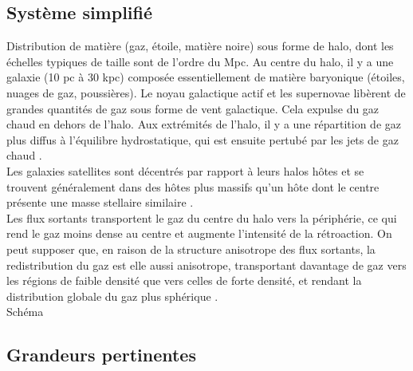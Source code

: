 \documentclass[a4paper, french, 11 pt]{article}
\begin{document}
\subsection{Système simplifié}
Distribution de matière (gaz, étoile, matière noire) sous forme de halo, dont les échelles typiques de taille sont de l'ordre du Mpc. Au centre du halo, il y a une galaxie (10 pc à 30 kpc) composée essentiellement de matière baryonique (étoiles, nuages de gaz, poussières). Le noyau galactique actif et les supernovae libèrent de grandes quantités de gaz sous forme de vent galactique. Cela expulse du gaz chaud en dehors de l'halo. Aux extrémités de l'halo, il y a une répartition de gaz plus diffus à l'équilibre hydrostatique, qui est ensuite pertubé par les jets de gaz chaud \cite{pandey2024godmaxmodelinggasthermodynamics}.\\
Les galaxies satellites sont décentrés par rapport à leurs halos hôtes et se trouvent généralement dans des hôtes plus massifs qu'un hôte dont le centre présente une masse stellaire similaire \cite{mccarthy2025flamingocombiningkineticsz}.\\
Les flux sortants transportent le gaz du centre du halo vers la périphérie, ce qui rend le gaz moins dense au centre et augmente l'intensité de la rétroaction. On peut supposer que, en raison de la structure anisotrope des flux sortants, la redistribution du gaz est elle aussi anisotrope, transportant davantage de gaz vers les régions de faible densité que vers celles de forte densité, et rendant la distribution globale du gaz plus sphérique \cite{Ondaro_Mallea_2025}.\\
Schéma

\newpage
\subsection{Grandeurs pertinentes}
\end{document}
